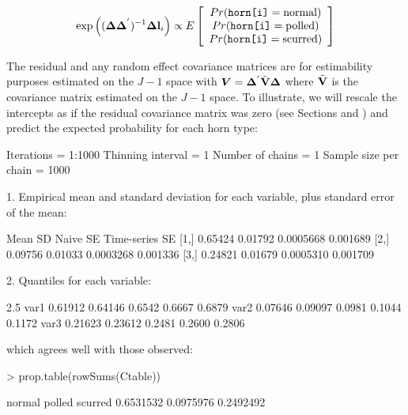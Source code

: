 \documentclass{article}
\begin{document}
\begin{equation}
\textrm{exp}\left(({\bm \Delta}{\bm \Delta}^{'})^{-1}{\bm \Delta}{\bf l}_{i}\right) \propto E\left[\begin{array}{c} Pr(\texttt{horn[i]}=\textrm{normal})\\ Pr(\texttt{horn[i]}=\textrm{polled})\\ Pr(\texttt{horn[i]}=\textrm{scurred}) \end{array} \right]
\end{equation}

The residual and any random effect covariance matrices are for estimability purposes estimated on the $J-1$ space with  ${\bm V}={\bm \Delta}^{'}\tilde{\bf V}{\bm \Delta}$ where $\tilde{\bf V}$ is the covariance matrix estimated on the $J-1$ space. To illustrate, we will rescale the intercepts as if the residual covariance matrix was zero (see Sections and \label{pred-sec} \label{cat-sec}) and predict the expected probability for each horn type:

\begin{Schunk}
\begin{Soutput}
Iterations = 1:1000
Thinning interval = 1 
Number of chains = 1 
Sample size per chain = 1000 

1. Empirical mean and standard deviation for each variable,
   plus standard error of the mean:

        Mean      SD  Naive SE Time-series SE
[1,] 0.65424 0.01792 0.0005668       0.001689
[2,] 0.09756 0.01033 0.0003268       0.001336
[3,] 0.24821 0.01679 0.0005310       0.001709

2. Quantiles for each variable:

        2.5%
var1 0.61912 0.64146 0.6542 0.6667 0.6879
var2 0.07646 0.09097 0.0981 0.1044 0.1172
var3 0.21623 0.23612 0.2481 0.2600 0.2806
\end{Soutput}
\end{Schunk}

which agrees well with those observed:

\begin{Schunk}
\begin{Sinput}
> prop.table(rowSums(Ctable))
\end{Sinput}
\begin{Soutput}
   normal    polled   scurred 
0.6531532 0.0975976 0.2492492 
\end{Soutput}
\end{Schunk}
\end{document}
